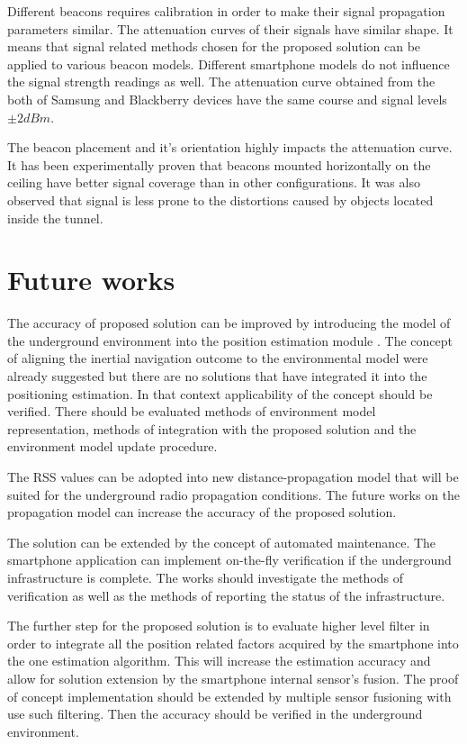 \documentclass[../main.tex]{subfiles}
\begin{document}
Different beacons requires calibration in order to make their signal propagation parameters similar. The attenuation curves of their signals have similar shape. It means that signal related methods chosen for the proposed solution can be applied to various beacon models. Different smartphone models do not influence the signal strength readings as well. The attenuation curve obtained from the both of Samsung and Blackberry devices have the same course and signal levels $\pm2dBm$.

The beacon placement and it's orientation highly impacts the attenuation curve. It has been experimentally proven that beacons mounted horizontally on the ceiling have better signal coverage than in other configurations. It was also observed that signal is less prone to the distortions caused by objects located inside the tunnel.



\section{Future works} %
\label{sec:future_works}

The accuracy of proposed solution can be improved by introducing the model of the underground environment into the position estimation module \cite{positioning_tests}. The concept of aligning the inertial navigation outcome to the environmental model were already suggested but there are no solutions that have integrated it into the positioning estimation. In that context applicability of the concept should be verified. There should be evaluated methods of environment model representation, methods of integration with the proposed solution and the environment model update procedure.

The RSS values can be adopted into new distance-propagation model that will be suited for the underground radio propagation conditions. The future works on the propagation model can increase the accuracy of the proposed solution.

The solution can be extended by the concept of automated maintenance. The smartphone application can implement on-the-fly verification if the underground infrastructure is complete. The works should investigate the methods of verification as well as the methods of reporting the status of the infrastructure.

The further step for the proposed solution is to evaluate higher level filter in order to integrate all the position related factors acquired by the smartphone into the one estimation algorithm. This will increase the estimation accuracy and allow for solution extension by the smartphone internal sensor's fusion. The proof of concept implementation should be extended by multiple sensor fusioning with use such filtering. Then the accuracy should be verified in the underground environment.
\end{document}
